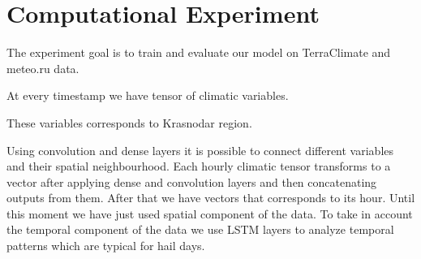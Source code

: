 \documentclass{article}
\begin{document}


\section{Computational Experiment}
The experiment goal is to train and evaluate our model on TerraClimate and meteo.ru data.

At every timestamp we have tensor of climatic variables.   
\begin{figure}[h]
\begin{minipage}[h]{0.55\linewidth}
\end{minipage}
\hfill
\begin{minipage}[h]{0.55\linewidth}
\end{minipage}
\end{figure}

These variables corresponds to Krasnodar region.

Using convolution and dense layers it is possible to connect different variables and their spatial neighbourhood. Each hourly climatic tensor transforms to a vector after applying dense and convolution layers and then concatenating outputs from them. After that we have vectors that corresponds to its hour. Until this moment we have just used spatial component of the data. To take in account the temporal component of the data we use LSTM layers to analyze temporal patterns which are typical for hail days.

\end{document}
